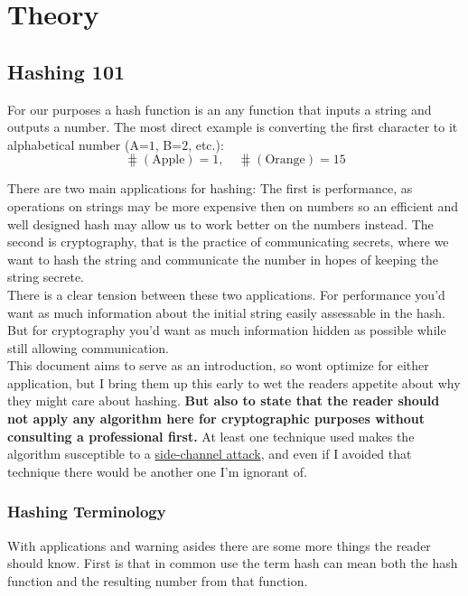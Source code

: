
\chapter{Theory}

\section{Hashing 101}
For our purposes a hash function is an any function that inputs a string and outputs a number.
The most direct example is converting the first character to it alphabetical number (A=$1$, B=$2$, etc.):
\[\hash(\text{Apple}) = 1,\quad \hash(\text{Orange}) = 15\]

There are two main applications for hashing:
The first is performance,
as operations on strings may be more expensive then on numbers so an efficient and well designed hash may allow us to work better on the numbers instead. 
The second is cryptography,
that is the practice of communicating secrets,
where we want to hash the string and communicate the number in hopes of keeping the string secrete.
\\

There is a clear tension between these two applications.
For performance you'd want as much information about the initial string easily assessable in the hash.
But for cryptography you'd want as much information hidden as possible while still allowing communication. 
\\

This document aims to serve as an introduction,
so wont optimize for either application,
but I bring them up this early to wet the readers appetite about why they might care about hashing.
{\textbf{ But also to state that the reader should not apply any algorithm here for cryptographic purposes without consulting a professional first.}}
At least one technique used makes the algorithm susceptible to a \hyperref[appx:side-channel]{side-channel attack},
and even if I avoided that technique there would be another one I'm ignorant of.

\subsection{Hashing Terminology}
With applications and warning asides there are some more things the reader should know.
First is that in common use the term hash can mean both the hash function and the resulting number from that function.

